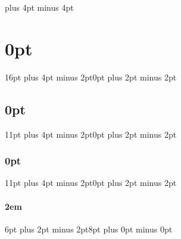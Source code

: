\newskip\bigskipamount   \bigskipamount =20pt plus 4pt minus 4pt
\setlength{\parskip}{0.75em}
\setlength{\parindent}{2em}

\usepackage{titlesec}
\titlespacing\section{0pt}{16pt plus 4pt minus 2pt}{0pt plus 2pt minus 2pt}
\titlespacing\subsection{0pt}{11pt plus 4pt minus 2pt}{0pt plus 2pt minus 2pt}
\titlespacing\subsubsection{0pt}{11pt plus 4pt minus 2pt}{0pt plus 2pt minus 2pt}
\titlespacing\paragraph{2em}{6pt plus 2pt minus 2pt}{8pt plus 0pt minus 0pt}

\usepackage{pbox}
\usepackage{array}%